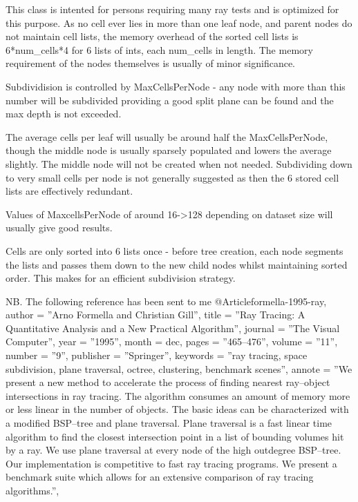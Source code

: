  This class is intented for persons requiring many ray tests and is optimized
 for this purpose. As no cell ever lies in more than one leaf node, and parent
 nodes do not maintain cell lists, the memory overhead of the sorted cell
 lists is 6*num\_cells*4 for 6 lists of ints, each num\_cells in length.
 The memory requirement of the nodes themselves is usually of minor
 significance.

 Subdividision is controlled by MaxCellsPerNode - any node with more than
 this number will be subdivided providing a good split plane can be found and
 the max depth is not exceeded.

 The average cells per leaf will usually be around half the MaxCellsPerNode,
 though the middle node is usually sparsely populated and lowers the average
 slightly. The middle node will not be created when not needed.
 Subdividing down to very small cells per node is not generally suggested
 as then the 6 stored cell lists are effectively redundant.

 Values of MaxcellsPerNode of around 16->128 depending on dataset size will
 usually give good results.

 Cells are only sorted into 6 lists once - before tree creation, each node
 segments the lists and passes them down to the new child nodes whilst
 maintaining sorted order. This makes for an efficient subdivision strategy.

 NB. The following reference has been sent to me
   @Article{formella-1995-ray,
     author =     ''Arno Formella and Christian Gill'',
     title =      ''{Ray Tracing: A Quantitative Analysis and a New
                   Practical Algorithm}'',
     journal =    ''{The Visual Computer}'',
     year =       ''{1995}'',
     month =       dec,
     pages =      ''{465--476}'',
     volume =     ''{11}'',
     number =     ''{9}'',
     publisher =  ''{Springer}'',
     keywords =   ''{ray tracing, space subdivision, plane traversal,
                    octree, clustering, benchmark scenes}'',
     annote =     ''{We present a new method to accelerate the process of
                    finding nearest ray--object intersections in ray
                    tracing. The algorithm consumes an amount of memory
                    more or less linear in the number of objects. The basic
                    ideas can be characterized with a modified BSP--tree
                    and plane traversal. Plane traversal is a fast linear
                    time algorithm to find the closest intersection point
                    in a list of bounding volumes hit by a ray. We use
                    plane traversal at every node of the high outdegree
                    BSP--tree. Our implementation is competitive to fast
                    ray tracing programs. We present a benchmark suite
                    which allows for an extensive comparison of ray tracing
                    algorithms.}'',
   }

